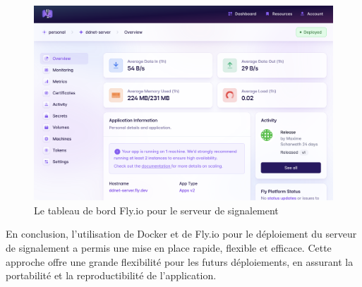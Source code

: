 \begin{figure}[ht]
    \centering
    \includegraphics[width=\textwidth]{assets/figures/fly.io.png}
    \caption{Le tableau de bord Fly.io pour le serveur de signalement}
    \label{fig:flyio-dashboard}
\end{figure}

En conclusion, l'utilisation de Docker et de Fly.io pour le déploiement du serveur de signalement a permis une mise en place rapide, flexible et efficace. Cette approche offre une grande flexibilité pour les futurs déploiements, en assurant la portabilité et la reproductibilité de l'application.